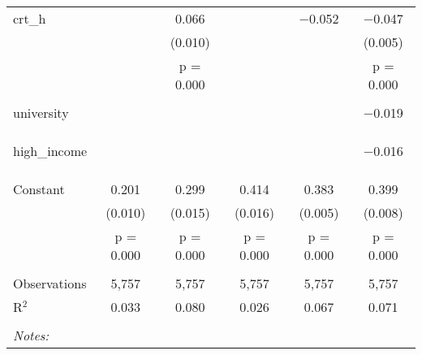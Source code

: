 \begin{table}[!htbp]
\begin{tabular}{@{\extracolsep{5pt}}lccccc}
 crt\_h &  & 0.066 &  & $-$0.052 & $-$0.047 \\ 
  &  & (0.010) &  &  & (0.005) \\ 
  &  & p = 0.000 &  &  & p = 0.000 \\ 
  & & & & & \\ 
 university &  &  &  &  & $-$0.019 \\ 
  &  &  &  &  &  \\ 
  &  &  &  &  &  \\ 
  & & & & & \\ 
 high\_income &  &  &  &  & $-$0.016 \\ 
  &  &  &  &  &  \\ 
  &  &  &  &  &  \\ 
  & & & & & \\ 
 Constant & 0.201 & 0.299 & 0.414 & 0.383 & 0.399 \\ 
  & (0.010) & (0.015) & (0.016) & (0.005) & (0.008) \\ 
  & p = 0.000 & p = 0.000 & p = 0.000 & p = 0.000 & p = 0.000 \\ 
  & & & & & \\ 
Observations & 5,757 & 5,757 & 5,757 & 5,757 & 5,757 \\ 
R$^{2}$ & 0.033 & 0.080 & 0.026 & 0.067 & 0.071 \\ 
\hline \\[-1.8ex] 
\textit{Notes:} & \multicolumn{5}{l}{} \\ 
\end{tabular} 
\end{table}  
